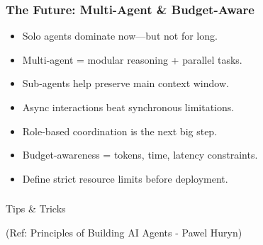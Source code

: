 \begin{frame}[fragile]\frametitle{The Future: Multi-Agent \& Budget-Aware}
    \begin{itemize}
        \item Solo agents dominate now—but not for long.
        \item Multi-agent = modular reasoning + parallel tasks.
        \item Sub-agents help preserve main context window.
        \item Async interactions beat synchronous limitations.
        \item Role-based coordination is the next big step.
        \item Budget-awareness = tokens, time, latency constraints.
        \item Define strict resource limits before deployment.
    \end{itemize}
\end{frame}

\begin{frame}[fragile]\frametitle{}
\begin{center}
{\Large Tips \& Tricks}

{\tiny (Ref: Principles of Building AI Agents - Pawel Huryn)}
\end{center}
\end{frame}

